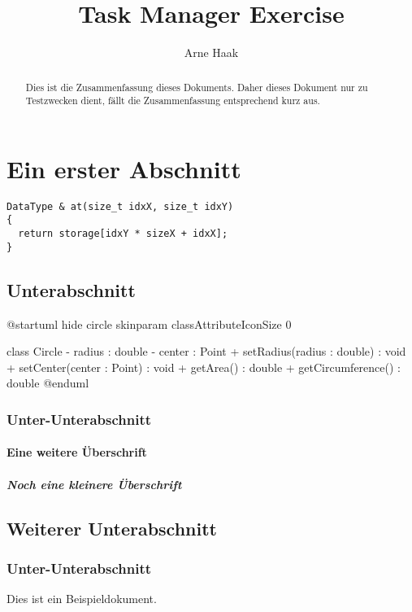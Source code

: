 \documentclass[a4paper]{scrartcl}
\title{Task Manager Exercise}
\author{Arne Haak}
\begin{document}
\maketitle

\begin{abstract}
Dies ist die Zusammenfassung dieses Dokuments. Daher dieses Dokument nur zu Testzwecken dient, fällt die Zusammenfassung entsprechend kurz aus.
\end{abstract}

\tableofcontents

\section{Ein erster Abschnitt}


\begin{verbatim}
DataType & at(size_t idxX, size_t idxY)
{
  return storage[idxY * sizeX + idxX];
}
\end{verbatim}

\subsection{Unterabschnitt}

\begin{plantuml}
@startuml
hide circle
skinparam classAttributeIconSize 0

class Circle {
- radius : double 
- center : Point 
+ setRadius(radius : double) : void
+ setCenter(center : Point) : void
+ getArea() : double
+ getCircumference() : double
}
@enduml
\end{plantuml}

\subsubsection{Unter-Unterabschnitt}

\paragraph{Eine weitere Überschrift}

\subparagraph{Noch eine kleinere Überschrift}

\subsection{Weiterer Unterabschnitt}

\subsubsection{Unter-Unterabschnitt}

Dies ist ein Beispieldokument.
\end{document}
